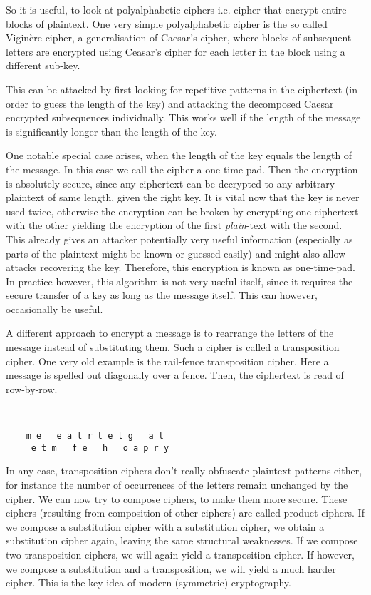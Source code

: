 So it is useful, to look at polyalphabetic ciphers i.e. cipher that encrypt entire blocks of plaintext. One very simple polyalphabetic cipher is the so called Vigin\`e{}re-cipher, a generalisation of Caesar's cipher, where blocks of subsequent letters are encrypted using Ceasar's cipher for each letter in the block using a different sub-key. 

This can be attacked by first looking for repetitive patterns in the ciphertext (in order to guess the length of the key) and attacking the decomposed Caesar encrypted subsequences individually. 
This works well if the length of the message is significantly longer than the length of the key. 

One notable special case arises, when the length of the key equals the length of the message. In this case we call the cipher a one-time-pad. Then the encryption is absolutely secure, since any ciphertext can be decrypted to any arbitrary plaintext of same length, given the right key. It is vital now that the key is never used twice, otherwise the encryption can be broken by encrypting one ciphertext with the other yielding the encryption of the first \emph{plain}-text with the second. This already gives an attacker potentially very useful information (especially as parts of the plaintext might be known or guessed easily) and might also allow attacks recovering the key. Therefore, this encryption is known as one-time-pad. In practice however, this algorithm is not very useful itself, since it requires the secure transfer of a key as long as the message itself. This can however, occasionally be useful. 

A different approach to encrypt a message is to rearrange the letters of the message instead of substituting them. Such a cipher is called a transposition cipher. One very old example is the rail-fence transposition cipher. Here a message is spelled out diagonally over a fence. Then, the ciphertext is read of row-by-row. 
\begin{example}\ 
  \begin{lstlisting}
    m e   e a t r t e t g   a t
     e t m   f e   h   o a p r y
  \end{lstlisting}
\end{example}

In any case, transposition ciphers don't really obfuscate plaintext patterns either, for instance the number of occurrences of the letters remain unchanged by the cipher. 
We can now try to compose ciphers, to make them more secure. These ciphers (resulting from composition of other ciphers) are called product ciphers. If we compose a substitution cipher with a substitution cipher, we obtain a substitution cipher again, leaving the same structural weaknesses. If we compose two transposition ciphers, we will again yield a transposition cipher. If however, we compose a substitution and a transposition, we will yield a much harder cipher. This is the key idea of modern (symmetric) cryptography. 
